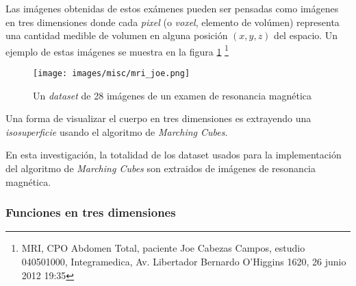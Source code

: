 Las imágenes obtenidas de estos exámenes pueden ser pensadas como imágenes en tres dimensiones donde cada \emph{pixel} (o \emph{voxel}, elemento de volúmen) representa una cantidad medible de volumen en alguna posición $(x, y, z)$ del espacio. Un ejemplo de estas imágenes se muestra en la figura \ref{f:flujoDeTrabajo:mri_joe} \footnote{MRI, CPO Abdomen Total, paciente Joe Cabezas Campos, estudio 040501000, Integramedica, Av. Libertador Bernardo O'Higgins 1620, 26 junio 2012 19:35}

\begin{figure}[p]
\centering
	\texttt{[image: images/misc/mri\_joe.png]}
\caption{Un \emph{dataset} de 28 imágenes de un examen de resonancia magnética}
\label{f:flujoDeTrabajo:mri_joe}
\end{figure}

Una forma de visualizar el cuerpo en tres dimensiones es extrayendo una \emph{isosuperficie} usando el algoritmo de \emph{Marching Cubes}.

En esta investigación, la totalidad de los dataset usados para la implementación del algoritmo de \emph{Marching Cubes} son extraidos de imágenes de resonancia magnética.
\newpage

\subsubsection{Funciones en tres dimensiones}
\label{ch:propuesta:sec:extraccionDeDatos:subsec:funcionesEnTresDimensiones}

